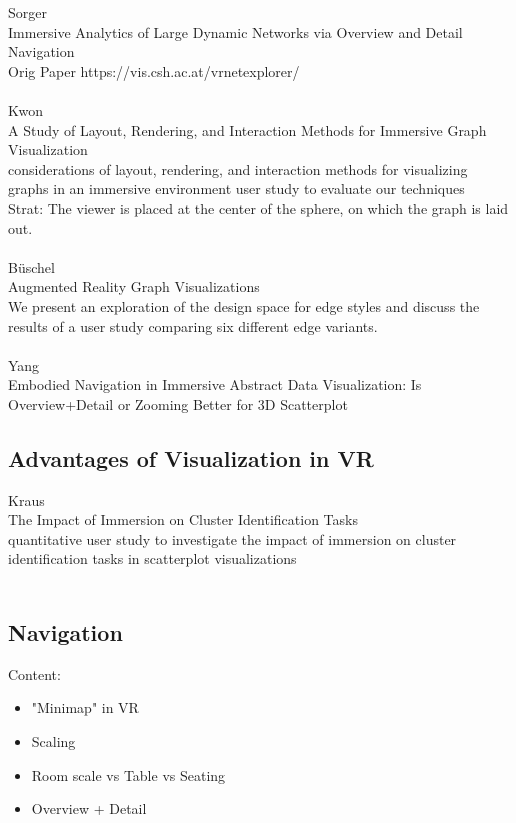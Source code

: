 Sorger\\
Immersive Analytics of Large Dynamic Networks via Overview and Detail Navigation\\
Orig Paper https://vis.csh.ac.at/vrnetexplorer/\\
\\
Kwon\\
A Study of Layout, Rendering, and Interaction Methods for Immersive Graph Visualization\\
considerations of layout, rendering, and interaction methods for visualizing graphs in an  immersive environment user study to evaluate our techniques\\
Strat: The viewer is placed at the center of the sphere, on which the graph is laid out.\\
\\
Büschel\\
Augmented Reality Graph Visualizations\\
We present an exploration of the design space for edge styles and discuss the results of a user study comparing six different edge variants.\\
\\
Yang\\
Embodied Navigation in Immersive Abstract Data Visualization:
Is Overview+Detail or Zooming Better for 3D Scatterplot\\

\subsection{Advantages of Visualization in VR}
Kraus\\
The Impact of Immersion on Cluster Identification Tasks\\
quantitative user study to investigate the impact of immersion on cluster identification tasks in scatterplot visualizations\\
\\

\subsection{Navigation}
Content:
\begin{itemize}
    \item "Minimap" in VR
    \item Scaling
    \item Room scale vs Table vs Seating
    \item Overview + Detail 
\end{itemize}


